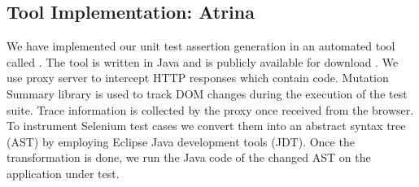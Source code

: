 \subsection{Tool Implementation: Atrina} \label{Sec:tool}
We have implemented our \javascript unit test assertion generation in an automated tool called \tool. The tool is written in Java and is publicly available for download \cite{atrina-dl}.
We use proxy server to intercept HTTP responses which contain \javascript code. \javascript Mutation Summary library \cite{mutationSummary} is used to track DOM changes during the execution of the test suite. Trace information is collected by the proxy once received from the browser. To instrument Selenium test cases we convert them into an abstract syntax tree (AST) by employing Eclipse Java development tools (JDT). Once the transformation is done, we run the Java code of the changed AST on the application under test.   

